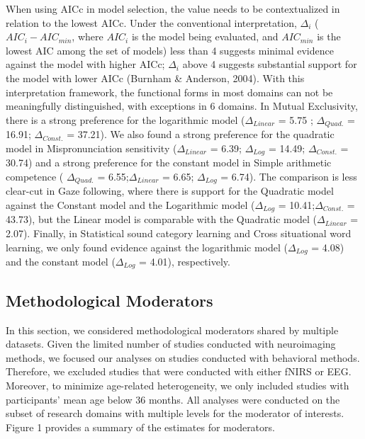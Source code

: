 \documentclass[10pt, letterpaper]{article}
\begin{document}
When using AICc in model selection, the value needs to be contextualized
in relation to the lowest AICc. Under the conventional interpretation,
\(\Delta_{i}\) (\(AIC_i - AIC_{min}\), where \(AIC_i\) is the model
being evaluated, and \(AIC_{min}\) is the lowest AIC among the set of
models) less than 4 suggests minimal evidence against the model with
higher AICc; \(\Delta_{i}\) above 4 suggests substantial support for the
model with lower AICc (Burnham \& Anderson, 2004). With this
interpretation framework, the functional forms in most domains can not
be meaningfully distinguished, with exceptions in 6 domains. In Mutual
Exclusivity, there is a strong preference for the logarithmic model
(\(\Delta_{Linear}\) = 5.75 ; \(\Delta_{Quad.}\) = 16.91;
\(\Delta_{Const.}\) = 37.21). We also found a strong preference for the
quadratic model in Mispronunciation sensitivity (\(\Delta_{Linear}\) =
6.39; \(\Delta_{Log}\) = 14.49; \(\Delta_{Const.}\) = 30.74) and a
strong preference for the constant model in Simple arithmetic competence
( \(\Delta_{Quad.}\) = 6.55;\(\Delta_{Linear}\) = 6.65; \(\Delta_{Log}\)
= 6.74). The comparison is less clear-cut in Gaze following, where there
is support for the Quadratic model against the Constant model and the
Logarithmic model (\(\Delta_{Log}\) = 10.41;\(\Delta_{Const.}\) =
43.73), but the Linear model is comparable with the Quadratic model
(\(\Delta_{Linear}\) = 2.07). Finally, in Statistical sound category
learning and Cross situational word learning, we only found evidence
against the logarithmic model (\(\Delta_{Log}\) = 4.08) and the constant
model (\(\Delta_{Log}\) = 4.01), respectively.

\hypertarget{methodological-moderators}{%
\subsection{Methodological Moderators}\label{methodological-moderators}}

In this section, we considered methodological moderators shared by
multiple datasets. Given the limited number of studies conducted with
neuroimaging methods, we focused our analyses on studies conducted with
behavioral methods. Therefore, we excluded studies that were conducted
with either fNIRS or EEG. Moreover, to minimize age-related
heterogeneity, we only included studies with participants' mean age
below 36 months. All analyses were conducted on the subset of research
domains with multiple levels for the moderator of interests. Figure 1
provides a summary of the estimates for moderators.
\end{document}
